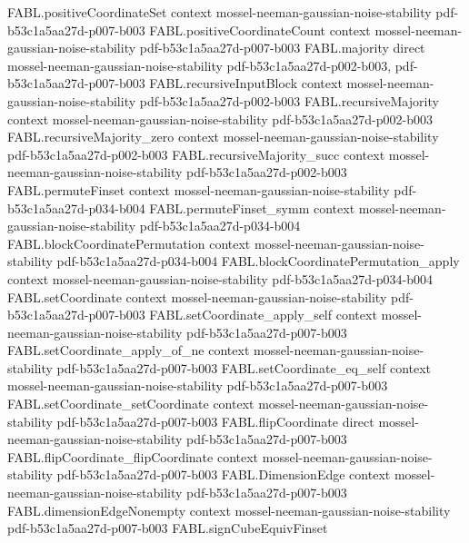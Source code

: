 \begin{theorem}
  {FABL.positiveCoordinateSet}
  {context}
  {mossel-neeman-gaussian-noise-stability}
  {pdf-b53c1a5aa27d-p007-b003}
\proofstep
  {FABL.positiveCoordinateCount}
  {context}
  {mossel-neeman-gaussian-noise-stability}
  {pdf-b53c1a5aa27d-p007-b003}
\proofstep
  {FABL.majority}
  {direct}
  {mossel-neeman-gaussian-noise-stability}
  {pdf-b53c1a5aa27d-p002-b003,
    pdf-b53c1a5aa27d-p007-b003}
\proofstep
  {FABL.recursiveInputBlock}
  {context}
  {mossel-neeman-gaussian-noise-stability}
  {pdf-b53c1a5aa27d-p002-b003}
\proofstep
  {FABL.recursiveMajority}
  {context}
  {mossel-neeman-gaussian-noise-stability}
  {pdf-b53c1a5aa27d-p002-b003}
\proofstep
  {FABL.recursiveMajority_zero}
  {context}
  {mossel-neeman-gaussian-noise-stability}
  {pdf-b53c1a5aa27d-p002-b003}
\proofstep
  {FABL.recursiveMajority_succ}
  {context}
  {mossel-neeman-gaussian-noise-stability}
  {pdf-b53c1a5aa27d-p002-b003}
\proofstep
  {FABL.permuteFinset}
  {context}
  {mossel-neeman-gaussian-noise-stability}
  {pdf-b53c1a5aa27d-p034-b004}
\proofstep
  {FABL.permuteFinset_symm}
  {context}
  {mossel-neeman-gaussian-noise-stability}
  {pdf-b53c1a5aa27d-p034-b004}
\proofstep
  {FABL.blockCoordinatePermutation}
  {context}
  {mossel-neeman-gaussian-noise-stability}
  {pdf-b53c1a5aa27d-p034-b004}
\proofstep
  {FABL.blockCoordinatePermutation_apply}
  {context}
  {mossel-neeman-gaussian-noise-stability}
  {pdf-b53c1a5aa27d-p034-b004}
\proofstep
  {FABL.setCoordinate}
  {context}
  {mossel-neeman-gaussian-noise-stability}
  {pdf-b53c1a5aa27d-p007-b003}
\proofstep
  {FABL.setCoordinate_apply_self}
  {context}
  {mossel-neeman-gaussian-noise-stability}
  {pdf-b53c1a5aa27d-p007-b003}
\proofstep
  {FABL.setCoordinate_apply_of_ne}
  {context}
  {mossel-neeman-gaussian-noise-stability}
  {pdf-b53c1a5aa27d-p007-b003}
\proofstep
  {FABL.setCoordinate_eq_self}
  {context}
  {mossel-neeman-gaussian-noise-stability}
  {pdf-b53c1a5aa27d-p007-b003}
\proofstep
  {FABL.setCoordinate_setCoordinate}
  {context}
  {mossel-neeman-gaussian-noise-stability}
  {pdf-b53c1a5aa27d-p007-b003}
\proofstep
  {FABL.flipCoordinate}
  {direct}
  {mossel-neeman-gaussian-noise-stability}
  {pdf-b53c1a5aa27d-p007-b003}
\proofstep
  {FABL.flipCoordinate_flipCoordinate}
  {context}
  {mossel-neeman-gaussian-noise-stability}
  {pdf-b53c1a5aa27d-p007-b003}
\proofstep
  {FABL.DimensionEdge}
  {context}
  {mossel-neeman-gaussian-noise-stability}
  {pdf-b53c1a5aa27d-p007-b003}
\proofstep
  {FABL.dimensionEdgeNonempty}
  {context}
  {mossel-neeman-gaussian-noise-stability}
  {pdf-b53c1a5aa27d-p007-b003}
\proofstep
  {FABL.signCubeEquivFinset}

\end{theorem}
